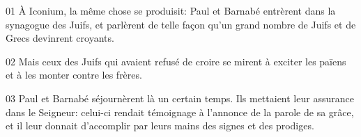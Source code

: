 01 À Iconium, la même chose se produisit: Paul et Barnabé entrèrent dans la synagogue des Juifs, et parlèrent de telle façon qu’un grand nombre de Juifs et de Grecs devinrent croyants.

02 Mais ceux des Juifs qui avaient refusé de croire se mirent à exciter les païens et à les monter contre les frères.

03 Paul et Barnabé séjournèrent là un certain temps. Ils mettaient leur assurance dans le Seigneur: celui-ci rendait témoignage à l’annonce de la parole de sa grâce, et il leur donnait d’accomplir par leurs mains des signes et des prodiges.